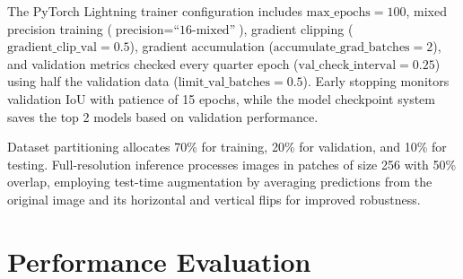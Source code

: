 \documentclass[final]{cmpreport_02}
\begin{document}
The PyTorch Lightning trainer configuration includes $\text{max\_epochs} = 100$, mixed precision training ($\text{precision} = \text{``16-mixed''}$), gradient clipping ($\text{gradient\_clip\_val} = 0.5$), gradient accumulation ($\text{accumulate\_grad\_batches} = 2$), and validation metrics checked every quarter epoch ($\text{val\_check\_interval} = 0.25$) using half the validation data ($\text{limit\_val\_batches} = 0.5$). Early stopping monitors validation IoU with patience of 15 epochs, while the model checkpoint system saves the top 2 models based on validation performance.

Dataset partitioning allocates 70\% for training, 20\% for validation, and 10\% for testing. Full-resolution inference processes images in patches of size 256 with 50\% overlap, employing test-time augmentation by averaging predictions from the original image and its horizontal and vertical flips for improved robustness.
\section{Performance Evaluation}
%
\end{document}
